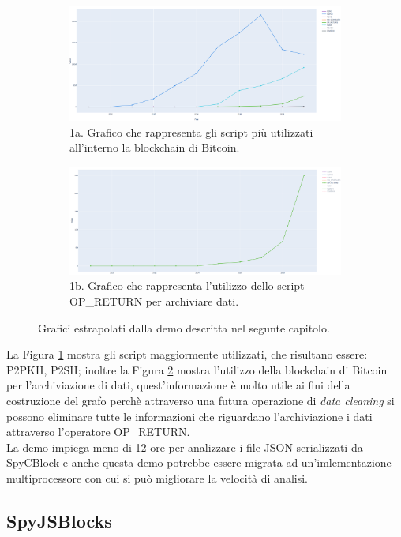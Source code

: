     \begin{figure}
    \begin{subfigure}{\textwidth}
      \centering
      \includegraphics[width=.8\linewidth]{images/demo/analytics/result-global.png}
      \caption{1a. Grafico che rappresenta gli script più utilizzati all'interno la blockchain di Bitcoin.}
      \label{fig:globalAnalisis}
    \end{subfigure}%
    \begin{subfigure}{\textwidth}
      \centering
      \includegraphics[width=.8\linewidth]{images/demo/analytics/opt_return.png}
      \caption{1b.  Grafico che rappresenta l'utilizzo dello script OP\_RETURN per archiviare dati.}
      \label{fig:optReturnScript}
    \end{subfigure}
    \caption{Grafici estrapolati dalla demo descritta nel segunte capitolo.}
    \label{fig:analisisScript}
    \end{figure}

La Figura \ref{fig:globalAnalisis} mostra gli script maggiormente utilizzati, che risultano essere: P2PKH, P2SH; inoltre la Figura \ref{fig:optReturnScript} mostra l'utilizzo della blockchain di Bitcoin per l'archiviazione di dati, quest'informazione è molto utile ai fini della costruzione del grafo perchè attraverso una futura operazione di \emph{data cleaning} si possono eliminare tutte le informazioni che riguardano l'archiviazione i dati attraverso l'operatore OP\_RETURN.\\
La demo impiega meno di 12 ore per analizzare i file JSON serializzati da SpyCBlock e anche questa demo potrebbe essere migrata ad un'imlementazione multiprocessore con cui si può migliorare la velocità di analisi.
\subsection{SpyJSBlocks} \label{sec:SpyJSBlocks}
